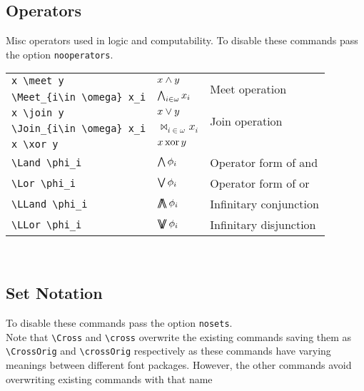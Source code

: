 \documentclass[leqno,11pt]{amsart}
\begin{document}
\subsection{Operators}
Misc operators used in logic and computability.  To disable these commands pass the option \verb=nooperators=.\\

\begin{tabular}{l |  l | l}\toprule
\verb=x \meet y= 				& \( x \mathbin{\wedge} y \) & \multirow{2}{*}{Meet operation} \\[6pt]
	\verb=\Meet_{i\in \omega} x_i=		& \( \mathop{\bigwedge}_{i\in \omega} x_i \) & \\ \midrule
	\verb=x \join y= 				& \(x  \mathbin{\vee} y \) & \multirow{2}{*}{Join operation}  \\[6pt]
	\verb=\Join_{i\in \omega} x_i=		& \( \Join_{i\in \omega} x_i \) & \\ \midrule
	\verb=x \xor y=						& \( x \operatorname{xor} y \)  & \\ \midrule
	\verb=\Land \phi_i=				& \( \mathop{\bigwedge} \phi_i \) & Operator form of and\\ \midrule
	\verb=\Lor \phi_i=				& \( \mathop{\bigvee} \phi_i \) & Operator form of or\\ \midrule
	\verb=\LLand \phi_i=				& \( \mathop{\bigwedge\mkern-15mu\bigwedge} \phi_i \) & Infinitary conjunction\\ \midrule
	\verb=\LLor \phi_i=				& \( \mathop{\bigvee\mkern-15mu\bigvee} \phi_i \) & Infinitary disjunction\\
	\bottomrule
\end{tabular}          \\	

\subsection{Set Notation}
To disable these commands pass the option \verb=nosets=.\\

Note that \verb=\Cross= and \verb=\cross= overwrite the existing commands saving them as \verb=\CrossOrig= and \verb=\crossOrig= respectively as these commands have varying meanings between different font packages.  However, the other commands avoid overwriting existing commands with that name 
\end{document}
